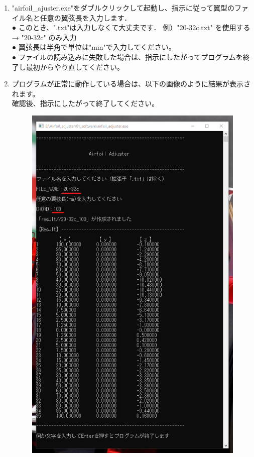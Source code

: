 \documentclass[12pt,a4paper]{jsarticle}
\begin{document}
\begin{enumerate}
\begin{figure}[htbp]
\begin{center}
              \end{center}
          \end{figure} \\
          \newpage
    \item "airfoil\_ajuster.exe"をダブルクリックして起動し、指示に従って翼型のファイル名と任意の翼弦長を入力します．\\
          ● このとき、".txt"は入力しなくて大丈夫です． 例）"20-32c.txt" を使用する → "20-32c" のみ入力\\
          ● 翼弦長は半角で単位は"mm"で入力してください。\\
          ● ファイルの読み込みに失敗した場合は、指示にしたがってプログラムを終了し最初からやり直してください。\\
    \item プログラムが正常に動作している場合は、以下の画像のように結果が表示されます。
          \\確認後、指示にしたがって終了してください。\\
          \begin{figure}[htbp]
              \begin{center}
                  \includegraphics[width=125mm]{images/image_8.png}

\end{center}
\end{figure}
\end{enumerate}
\end{document}
